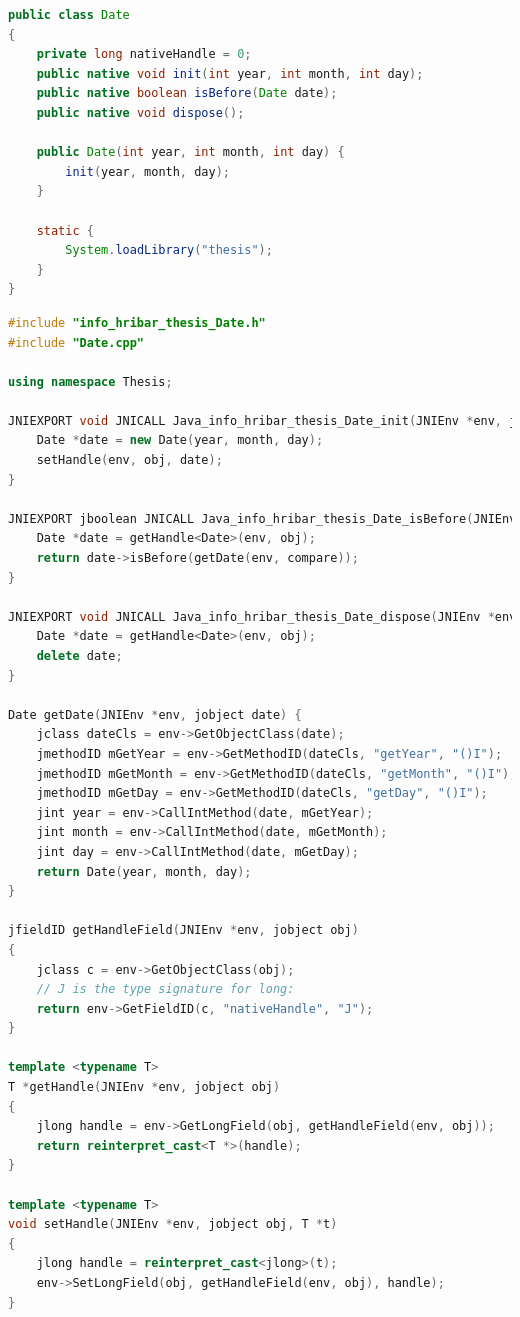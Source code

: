 \begin{lstlisting}[caption={Primer Java ovoja C++ razreda \texttt{Date}.}, label=code:android-java-wrapper, language=Java]
public class Date
{
	private long nativeHandle = 0;
	public native void init(int year, int month, int day);
	public native boolean isBefore(Date date);
	public native void dispose();

	public Date(int year, int month, int day) {
		init(year, month, day);
	}

	static {
		System.loadLibrary("thesis");
	}
}
\end{lstlisting}

\begin{lstlisting}[caption={Primer mosta med jezikoma Java in C++ razreda \texttt{Date}.}, label=code:android-cpp-wrapper, language=C++]
#include "info_hribar_thesis_Date.h"
#include "Date.cpp"

using namespace Thesis;

JNIEXPORT void JNICALL Java_info_hribar_thesis_Date_init(JNIEnv *env, jobject obj, jint year, jint month, jint day) {
	Date *date = new Date(year, month, day);
	setHandle(env, obj, date);
}

JNIEXPORT jboolean JNICALL Java_info_hribar_thesis_Date_isBefore(JNIEnv *env, jobject obj, jobject compare) {
	Date *date = getHandle<Date>(env, obj);
	return date->isBefore(getDate(env, compare));
}

JNIEXPORT void JNICALL Java_info_hribar_thesis_Date_dispose(JNIEnv *env, jobject obj) {
	Date *date = getHandle<Date>(env, obj);
	delete date;
}

Date getDate(JNIEnv *env, jobject date) {
	jclass dateCls = env->GetObjectClass(date);
	jmethodID mGetYear = env->GetMethodID(dateCls, "getYear", "()I");
	jmethodID mGetMonth = env->GetMethodID(dateCls, "getMonth", "()I");
	jmethodID mGetDay = env->GetMethodID(dateCls, "getDay", "()I");
	jint year = env->CallIntMethod(date, mGetYear);
	jint month = env->CallIntMethod(date, mGetMonth);
	jint day = env->CallIntMethod(date, mGetDay);
	return Date(year, month, day);
}

jfieldID getHandleField(JNIEnv *env, jobject obj)
{
    jclass c = env->GetObjectClass(obj);
    // J is the type signature for long:
    return env->GetFieldID(c, "nativeHandle", "J");
}

template <typename T>
T *getHandle(JNIEnv *env, jobject obj)
{
    jlong handle = env->GetLongField(obj, getHandleField(env, obj));
    return reinterpret_cast<T *>(handle);
}

template <typename T>
void setHandle(JNIEnv *env, jobject obj, T *t)
{
    jlong handle = reinterpret_cast<jlong>(t);
    env->SetLongField(obj, getHandleField(env, obj), handle);
}
\end{lstlisting}

